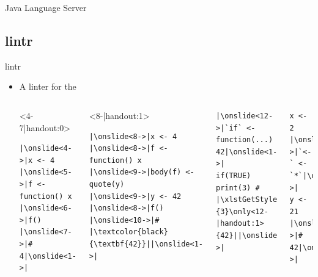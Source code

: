 \documentclass[
   aspectratio=169, %
   10pt, %
   uniqueslidenumber,
   handout,
   professionalfonts
]{beamer}
\makeatletter
\DeclareRobustCommand*\xfancyul[2][white]{%
   \def\fancyul@background{#1}%
   \def\ULdepth{1pt}%
   \def\ULthickness{.1ex}%
   \contourlength{.35pt}%
   \mbox{{\color{lightgray}\uline{\phantom{#2}}}\llap{\contour\fancyul@background{#2}}}%
}
\def\link#1#2{\href{#1}{\xfancyul{#2}}}
\makeatother
\begin{document}
\begin{frame}{Java Language Server}
\end{frame}

\subsection{lintr}
\begin{frame}[fragile]{lintr}
   \begin{itemize}
      \item<2-> A linter for the 
\begin{columns}[onlytextwidth,c]
\begin{onlyenv}<4-7|handout:0>
\begin{verbatim}
|\onslide<4->|x <- 4
|\onslide<5->|f <- function() x
|\onslide<6->|f() |\onslide<7->|# 4|\onslide<1->|
\end{verbatim}
\end{onlyenv}
\begin{onlyenv}<8-|handout:1>
\begin{verbatim}
|\onslide<8->|x <- 4
|\onslide<8->|f <- function() x
|\onslide<9->|body(f) <- quote(y)
|\onslide<9->|y <- 42
|\onslide<8->|f() |\onslide<10->|# |\textcolor{black}{\textbf{42}}||\onslide<1->|
\end{verbatim}
\endAnimateCode
\end{onlyenv}
\color{black}\vspace*{-\baselineskip}%
\begin{verbatim}
|\onslide<12->|`if` <- function(...) 42|\onslide<1->|
if(TRUE) print(3) # |\xlstGetStyle{comments}\only<-11|handout:0>{3}\only<12-|handout:1>{42}||\onslide<1->|
\end{verbatim}
\color{black}\vspace*{-\baselineskip}%
\begin{verbatim}
x <- 2
|\onslide<14->|`<-` <- `*`|\onslide<1->|
y <- 21 |\onslide<14->|# 42|\onslide<1->|
\end{verbatim}
\end{columns}\color{black}
\vspace*{-1\baselineskip}


\end{itemize}
\end{frame}
\end{document}
